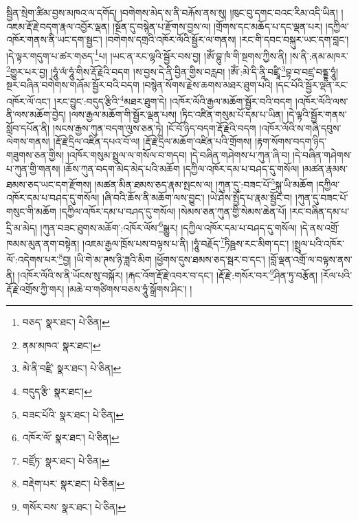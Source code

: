 སྦྱིན་སྲེག་ཚིམ་བྱས་མཁའ་ལ་དགོད། །བགེགས་མེད་ས་ནི་བརྐོས་ནས་སུ། །ཁུང་བུ་དགང་བའང་རིམ་འདི་ཡིན། །འཇམ་རྡོ་རྗེ་བདག་རྣལ་འབྱོར་ལྡན། །སྔོན་དུ་བསྙེན་པ་རྫོགས་བྱས་ལ། །གྲོགས་དང་མཆོད་པ་དང་ལྡན་པར། །དཀྱིལ་འཁོར་གནས་ནི་ཡང་དག་སྦྱང་། །བགེགས་དགྲའི་འཁོར་ལོའི་སྦྱོར་ལ་གནས། །རང་གི་དབང་བསྐུར་ཡང་དག་བླང་། །དེ་ལྟར་གདུག་པ་ཚར་གཅད་\footnote{བཅད་  སྣར་ཐང་།  པེ་ཅིན། }པ། །ཡང་ན་རང་ལྷའི་སྦྱོར་བས་བྱ། །ཨོཾ་བྷུ་ཁཾ་གི་སྔགས་ཀྱིས་ནི། །ས་ནི་:ནམ་མཁར་\footnote{ནམ་མཁའ་  སྣར་ཐང་། }གྱུར་པར་བྱ། །ཧཱུཾ་ལཾ་ཧཱུཾ་གིས་རྡོ་རྗེའི་བདག །ས་བྱས་དེ་ནི་བྱིན་གྱིས་བརླབ། །ཨོཾ་:མེ་དི་ནཱི་བཛྲཱི་\footnote{མེ་ནི་བཛྲི་  སྣར་ཐང་།  པེ་ཅིན། }བྷ་བ་བཛྲ་བནྡྷ་ཧཱུཾ། སྔར་བཞིན་བགེགས་གཞོམ་སྦྱོར་བའི་བདག །བསྙེན་སོགས་རྗེས་ཆགས་མཐར་ཐུག་པའི། །དང་པོའི་སྦྱོར་ལྡན་རང་འཁོར་ལོ་འང་། །རང་བྱུང་:བདུད་རྩིའི་\footnote{བདུད་རྩི་  སྣར་ཐང་། }མཐར་ཐུག་དེ། །འཁོར་ལོའི་རྒྱལ་མཆོག་སྦྱོར་བའི་བདག །འཁོར་ལོའི་ལས་ནི་ལས་མཆོག་བྱེད། །ལས་རྒྱལ་མཆོག་གི་སྦྱོར་ལྡན་པས། །ཏིང་འཛིན་གསུམ་པོ་དམ་པ་ཡིན། །དེ་ལྟའི་སྦྱོར་གནས་སློབ་དཔོན་ནི། །སངས་རྒྱས་ཀུན་བདག་ལུས་ཅན་ཏེ། །ངོ་བོ་ཉིད་བདག་རྡོ་རྗེའི་བདག །འཁོར་ལོའི་ས་གཞི་དབུས་ལེགས་གནས། །རྡོ་རྗེ་དྲིལ་འཛིན་དཔའ་བོ་ལ། །རྡོ་རྗེ་དྲིལ་མཆོག་འཛིན་པའི་གྲོགས། །རྟག་སོགས་བདག་ཉིད་གཟུགས་ཅན་གྱིས། །འཁོར་གསུམ་སྤྲུལ་ལ་གསོལ་བ་གདབ། །དེ་བཞིན་གཤེགས་པ་ཀུན་ཞི་བ། །དེ་བཞིན་གཤེགས་པ་ཀུན་གྱི་གནས། །ཆོས་ཀུན་བདག་མེད་མེད་པའི་མཆོག །དཀྱིལ་འཁོར་དམ་པ་བཤད་དུ་གསོལ། །མཚན་རྣམས་ཐམས་ཅད་ཡང་དག་རྫོགས། །མཚན་མིན་ཐམས་ཅད་རྣམ་སྤངས་ལ། །ཀུན་དུ་:བཟང་པོ་\footnote{བཟང་པོའི་  སྣར་ཐང་།  པེ་ཅིན། }སྐུ་ཡི་མཆོག །དཀྱིལ་འཁོར་དམ་པ་བཤད་དུ་གསོལ། །ཞི་བའི་ཆོས་ནི་མཆོག་ལས་བྱུང་། །ཡེ་ཤེས་སྤྱོད་པ་རྣམ་སྦྱོང་བ། །ཀུན་དུ་བཟང་པོ་གསུང་གི་མཆོག །དཀྱིལ་འཁོར་དམ་པ་བཤད་དུ་གསོལ། །སེམས་ཅན་ཀུན་གྱི་སེམས་ཆེན་པོ། །རང་བཞིན་དམ་པ་དྲི་མ་མེད། །ཀུན་བཟང་ཐུགས་མཆོག་:འཁོར་ལོས་\footnote{འཁོར་ལོ་  སྣར་ཐང་།  པེ་ཅིན། }སྒྱུར། །དཀྱིལ་འཁོར་དམ་པ་བཤད་དུ་གསོལ། །དེ་ནས་འགྲོ་ཁམས་མུན་ནག་བསྟེན། །འཇམ་རྒྱལ་ཁྲོས་པས་བལྟས་པ་ནི། །ཧཱུཾ་བརྗོད་\footnote{བཛྲོཏ་  སྣར་ཐང་།  པེ་ཅིན། }ཏིཥྛས་རང་མིག་དང་། །སྤྲུལ་པའི་འཁོར་ལོ་:འདེགས་པར་\footnote{བརྡེག་པར་  སྣར་ཐང་།  པེ་ཅིན། }བྱ། །ཡི་གེ་མ་ཊས་ཉི་ཟླའི་མིག །ཕྱོགས་དུས་ཐམས་ཅད་སྦར་བ་དང་། །བློ་ལྡན་འགྲོ་ལ་བལྟས་ནས་ནི། །འཁོར་ལོའི་ས་ནི་ཡོངས་སུ་བསྐོར། །རྐང་འོག་རྡོ་རྗེ་འབར་བ་དང་། །རྡོ་རྗེ་:གསོར་བར་\footnote{གསོར་བས་  སྣར་ཐང་།  པེ་ཅིན། }ཤིན་ཏུ་བརྩོན། །རོལ་པའི་རྡོ་རྗེ་འགྲོས་ཀྱི་གར། །མཆེ་བ་གཙིགས་བཅས་ཧཱུཾ་སྒྲོགས་ཤིང་། །
